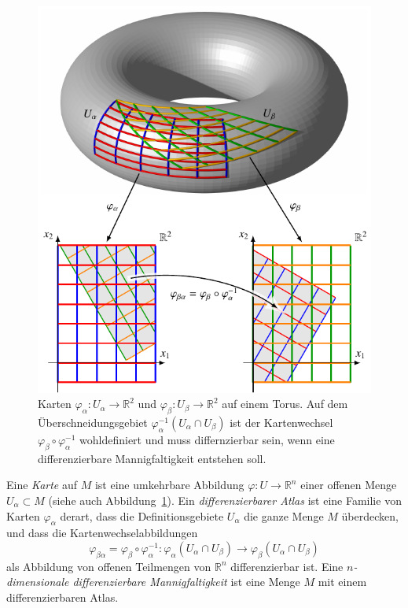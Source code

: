 \begin{figure}
\centering
\includegraphics{chapters/60-gruppen/images/karten.pdf}
\caption{Karten
$\varphi_\alpha\colon U_\alpha\to \mathbb{R}^2$
und
$\varphi_\beta\colon U_\beta\to \mathbb{R}^2$
auf einem Torus.
Auf dem Überschneidungsgebiet $\varphi_\alpha^{-1}(U_\alpha\cap U_\beta)$
ist der Kartenwechsel $\varphi_\beta\circ\varphi_\alpha^{-1}$ wohldefiniert
und muss differnzierbar sein, wenn eine differenzierbare Mannigfaltigkeit
entstehen soll.
\label{buch:gruppen:fig:karten}}
\end{figure}

\begin{definition}
%
Eine {\em Karte} auf $M$ ist eine umkehrbare Abbildung
$\varphi\colon U\to \mathbb{R}^n$ einer offenen Menge $U_\alpha\subset M$
(siehe auch Abbildung~\ref{buch:gruppen:fig:karten}).
Ein {\em differenzierbarer Atlas} ist eine Familie von Karten $\varphi_\alpha$
derart, dass die Definitionsgebiete $U_\alpha$ die ganze Menge $M$
überdecken, und dass die Kartenwechselabbildungen
\[
\varphi_{\beta\alpha}=\varphi_\beta\circ\varphi_\alpha^{-1}
\colon
\varphi_\alpha(U_\alpha\cap U_\beta)
\to
\varphi_\beta(U_\alpha\cap U_\beta)
\]
als Abbildung von offenen Teilmengen von $\mathbb{R}^n$ differenzierbar
ist.
Eine {\em $n$-dimensionale differenzierbare Mannigfaltigkeit} ist eine
Menge $M$ mit einem differenzierbaren Atlas.
%
\end{definition}

